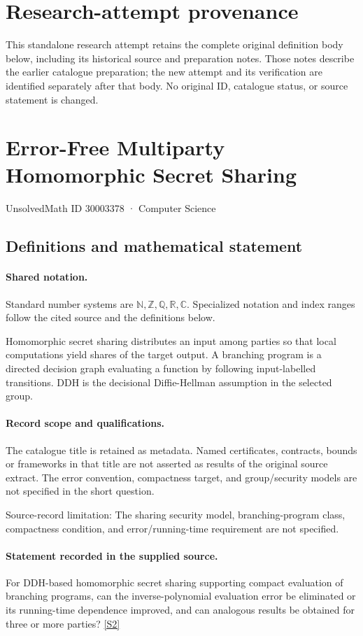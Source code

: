 \documentclass[11pt]{article}
\begin{document}
\section*{Research-attempt provenance}
This standalone research attempt retains the complete original definition body below,
including its historical source and preparation notes. Those notes describe the
earlier catalogue preparation; the new attempt and its verification are identified
separately after that body. No original ID, catalogue status, or source statement is changed.

\section{Error-Free Multiparty Homomorphic Secret Sharing}\label{30003378}
{\small UnsolvedMath ID 30003378 · Computer Science}
\subsection{Definitions and mathematical statement}

\paragraph{Shared notation.}Standard number systems are $\mathbb N,\mathbb Z,\mathbb Q,\mathbb R,\mathbb C$. Specialized notation and index ranges follow the cited source and the definitions below.


Homomorphic secret sharing distributes an input among parties so that local computations yield shares of the target output. A branching program is a directed decision graph evaluating a function by following input-labelled transitions. DDH is the decisional Diffie-Hellman assumption in the selected group.
\paragraph{Record scope and qualifications.}
The catalogue title is retained as metadata. Named certificates, contracts, bounds or frameworks in that title are not asserted as results of the original source extract.
The error convention, compactness target, and group/security models are not specified in the short question.

Source-record limitation: The sharing security model, branching-program class, compactness condition, and error/running-time requirement are not specified.
\paragraph{Statement recorded in the supplied source.}
For DDH-based homomorphic secret sharing supporting compact evaluation of branching programs, can the inverse-polynomial evaluation error be eliminated or its running-time dependence improved, and can analogous results be obtained for three or more parties? \href{https://doi.org/10.4171/owr/2017/5}{[S2]}
\end{document}
